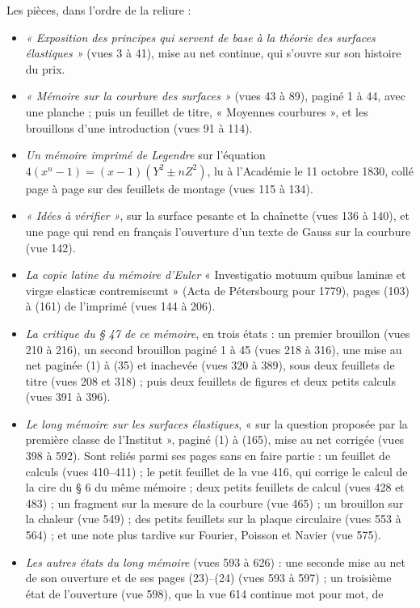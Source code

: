 \documentclass[11pt,a4paper]{article}
\begin{document}
Les pièces, dans l'ordre de la reliure :
\begin{itemize}
\item \emph{« Exposition des principes qui servent de base à la théorie des
surfaces élastiques »} (vues 3 à 41), mise au net continue, qui s'ouvre sur son
histoire du prix.
\item \emph{« Mémoire sur la courbure des surfaces »} (vues 43 à 89), paginé 1 à
44, avec une planche ; puis un feuillet de titre, « Moyennes courbures », et les
brouillons d'une introduction (vues 91 à 114).
\item \emph{Un mémoire imprimé de Legendre} sur l'équation
$4(x^n-1)=(x-1)(Y^2\pm nZ^2)$, lu à l'Académie le 11 octobre 1830, collé page à page
sur des feuillets de montage (vues 115 à 134).
\item \emph{« Idées à vérifier »}, sur la surface pesante et la chaînette (vues
136 à 140), et une page qui rend en français l'ouverture d'un texte de Gauss sur
la courbure (vue 142).
\item \emph{La copie latine du mémoire d'Euler} « Investigatio motuum quibus
laminæ et virgæ elasticæ contremiscunt » (Acta de Pétersbourg pour 1779), pages
(103) à (161) de l'imprimé (vues 144 à 206).
\item \emph{La critique du § 47 de ce mémoire}, en trois états : un premier
brouillon (vues 210 à 216), un second brouillon paginé 1 à 45 (vues 218 à 316),
une mise au net paginée (1) à (35) et inachevée (vues 320 à 389), sous deux
feuillets de titre (vues 208 et 318) ; puis deux feuillets de figures et deux
petits calculs (vues 391 à 396).
\item \emph{Le long mémoire sur les surfaces élastiques}, « sur la question
proposée par la première classe de l'Institut », paginé (1) à (165), mise au net
corrigée (vues 398 à 592). Sont reliés parmi ses pages sans en faire partie : un
feuillet de calculs (vues 410--411) ; le petit feuillet de la vue 416, qui corrige
le calcul de la cire du § 6 du même mémoire ; deux petits feuillets de calcul
(vues 428 et 483) ; un fragment sur la mesure de la courbure (vue 465) ; un
brouillon sur la chaleur (vue 549) ; des petits feuillets sur la plaque circulaire
(vues 553 à 564) ; et une note plus tardive sur Fourier, Poisson et Navier (vue
575).
\item \emph{Les autres états du long mémoire} (vues 593 à 626) : une seconde mise
au net de son ouverture et de ses pages (23)--(24) (vues 593 à 597) ; un
troisième état de l'ouverture (vue 598), que la vue 614 continue mot pour mot, de

\end{itemize}
\end{document}
